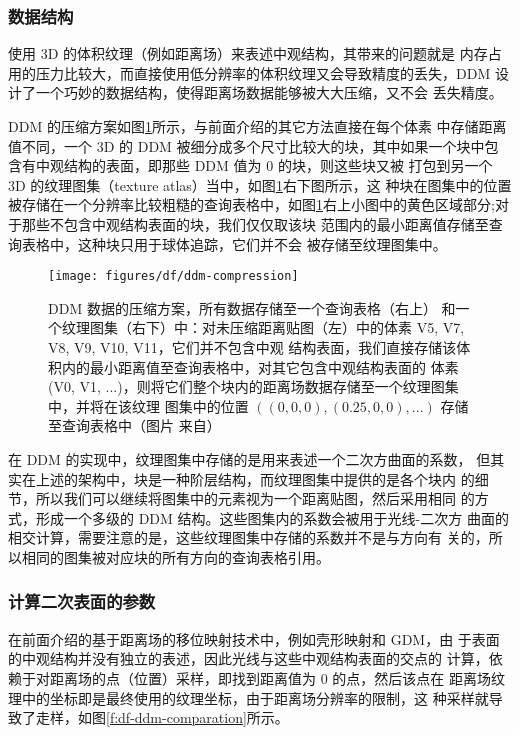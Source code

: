 \subsubsection{数据结构}
使用 3D 的体积纹理（例如距离场）来表述中观结构，其带来的问题就是 内存占用的压力比较大，而直接使用低分辨率的体积纹理又会导致精度的丢失，DDM 设计了一个巧妙的数据结构，使得距离场数据能够被大大压缩，又不会 丢失精度。

DDM 的压缩方案如图\ref{f:df-ddm-compression}所示，与前面介绍的其它方法直接在每个体素 中存储距离值不同，一个 3D 的 DDM 被细分成多个尺寸比较大的块，其中如果一个块中包含有中观结构的表面，即那些 DDM 值为 0 的块，则这些块又被 打包到另一个 3D 的纹理图集（texture atlas）当中，如图\ref{f:df-ddm-compression}右下图所示，这 种块在图集中的位置被存储在一个分辨率比较粗糙的查询表格中，如图\ref{f:df-ddm-compression}右上小图中的黄色区域部分;对于那些不包含中观结构表面的块，我们仅仅取该块 范围内的最小距离值存储至查询表格中，这种块只用于球体追踪，它们并不会 被存储至纹理图集中。

\begin{figure}
	\texttt{[image: figures/df/ddm-compression]}
	\caption{DDM 数据的压缩方案，所有数据存储至一个查询表格（右上） 和一个纹理图集（右下）中：对未压缩距离贴图（左）中的体素 V5, V7, V8, V9, V10, V11，它们并不包含中观 结构表面，我们直接存储该体积内的最小距离值至查询表格中，对其它包含中观结构表面的 体素 (V0, V1, ...)，则将它们整个块内的距离场数据存储至一个纹理图集中，并将在该纹理 图集中的位置 $((0,0,0),(0.25,0,0),...)$ 存储至查询表格中（图片 来自\cite{a:directional-distance-maps}）}
	\label{f:df-ddm-compression}
\end{figure}

在 DDM 的实现中，纹理图集中存储的是用来表述一个二次方曲面的系数， 但其实在上述的架构中，块是一种阶层结构，而纹理图集中提供的是各个块内 的细节，所以我们可以继续将图集中的元素视为一个距离贴图，然后采用相同 的方式，形成一个多级的 DDM 结构。这些图集内的系数会被用于光线-二次方 曲面的相交计算，需要注意的是，这些纹理图集中存储的系数并不是与方向有 关的，所以相同的图集被对应块的所有方向的查询表格引用。



\subsubsection{计算二次表面的参数}
在前面介绍的基于距离场的移位映射技术中，例如壳形映射和 GDM，由 于表面的中观结构并没有独立的表述，因此光线与这些中观结构表面的交点的 计算，依赖于对距离场的点（位置）采样，即找到距离值为 0 的点，然后该点在 距离场纹理中的坐标即是最终使用的纹理坐标，由于距离场分辨率的限制，这 种采样就导致了走样，如图\ref{f:df-ddm-comparation}所示。

